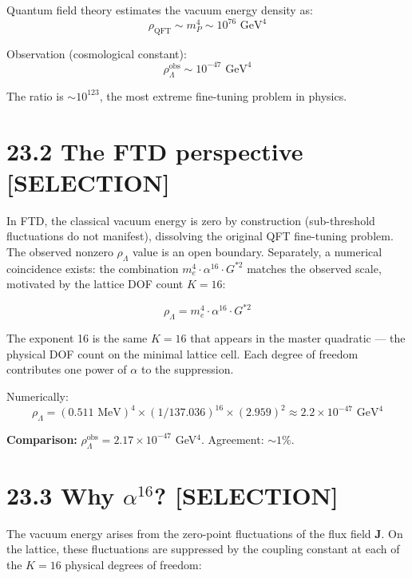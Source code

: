 \documentclass[
  11pt,
  letterpaper,
  twoside,
  openany]{book}
\makeatletter
\let\orig@section\section
\renewcommand{\section}{\needspace{8\baselineskip}\orig@section}
\makeatother
\begin{document}
Quantum field theory estimates the vacuum energy density as: \[
\rho_{\text{QFT}} \sim m_P^4 \sim 10^{76} \text{ GeV}^4
\]

Observation (cosmological constant): \[
\rho_\Lambda^{\text{obs}} \sim 10^{-47} \text{ GeV}^4
\]

The ratio is \(\sim 10^{123}\), the most extreme fine-tuning problem in
physics.

\section{23.2 The FTD perspective
{[}SELECTION{]}}\label{the-ftd-perspective-selection}

In FTD, the classical vacuum energy is zero by construction
(sub-threshold fluctuations do not manifest), dissolving the original
QFT fine-tuning problem. The observed nonzero \(\rho_\Lambda\) value is
an open boundary. Separately, a numerical coincidence exists: the
combination \(m_e^4 \cdot \alpha^{16} \cdot G^{*2}\) matches the
observed scale, motivated by the lattice DOF count \(K = 16\):

\begin{ftdselection}

\[
\rho_\Lambda = m_e^4 \cdot \alpha^{16} \cdot G^{*2}
\tag{23.1}
\]

\end{ftdselection}

The exponent 16 is the same \(K = 16\) that appears in the master
quadratic --- the physical DOF count on the minimal lattice cell. Each
degree of freedom contributes one power of \(\alpha\) to the
suppression.

Numerically: \[
\rho_\Lambda = (0.511 \text{ MeV})^4 \times (1/137.036)^{16} \times (2.959)^2 \approx 2.2 \times 10^{-47} \text{ GeV}^4
\]

\textbf{Comparison:}
\(\rho_\Lambda^{\text{obs}} = 2.17 \times 10^{-47}\) GeV\(^4\).
Agreement: \(\sim 1\%\).

\section{\texorpdfstring{23.3 Why \(\alpha^{16}\)?
{[}SELECTION{]}}{23.3 Why \textbackslash alpha\^{}\{16\}? {[}SELECTION{]}}}\label{why-alpha16-selection}

The vacuum energy arises from the zero-point fluctuations of the flux
field \(\mathbf{J}\). On the lattice, these fluctuations are suppressed
by the coupling constant at each of the \(K = 16\) physical degrees of
freedom:
\end{document}
